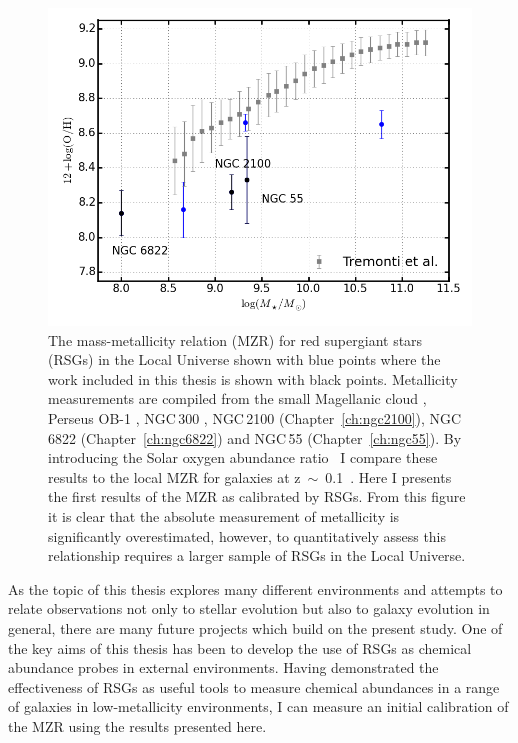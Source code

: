 \begin{figure}
 \centering
\includegraphics[width=\textwidth]{conclusions/MZR-RSGs}
\caption[Mass-metallicity relation from red supergiant stars]{
The mass-metallicity relation (MZR) for red supergiant stars (RSGs) in the Local Universe shown with blue points where the work included in this thesis is shown with black points.
Metallicity measurements are compiled from the small Magellanic cloud
\protect\citep{2015ApJ...806...21D}, Perseus OB-1
\protect\citep{2014ApJ...788...58G}, NGC\,300
\protect\citep{2015ApJ...805..182G},
NGC\,2100 (Chapter~\ref{ch:ngc2100}),
NGC\,6822 (Chapter~\ref{ch:ngc6822})
and NGC\,55 (Chapter~\ref{ch:ngc55}).
By introducing the Solar oxygen abundance ratio~\citep[12 + $\log$ (0/H)$_{\odot}$~=~8.69][]{2009ARA&A..47..481A} I compare these results to the local MZR for galaxies at z~$\sim$~0.1~\citep{Tremonti04}.
Here I presents the first results of the MZR as calibrated by RSGs.
From this figure it is clear that the absolute measurement of metallicity is significantly overestimated, however, to quantitatively assess this relationship requires a larger sample of RSGs in the Local Universe.
\label{fig:concMZR}
         }
\end{figure}

As the topic of this thesis explores many different environments and attempts to relate observations not only to stellar evolution but also to galaxy evolution in general, there are many future projects which build on the present study.
One of the key aims of this thesis has been to develop the use of RSGs as chemical abundance probes in external environments.
Having demonstrated the effectiveness of RSGs as useful tools to measure chemical abundances in a range of galaxies in low-metallicity environments, I can measure an initial calibration of the MZR using the results presented here.

